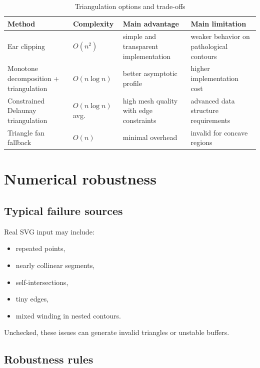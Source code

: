 \begin{table}[htbp]
\centering
\caption{Triangulation options and trade-offs}
\label{tab:triangulation_tradeoffs}
\begin{tabular}{>{\raggedright\arraybackslash}p{3.4cm} >{\raggedright\arraybackslash}p{2.2cm} >{\raggedright\arraybackslash}p{3.8cm} >{\raggedright\arraybackslash}p{4.5cm}}
\toprule
\textbf{Method} & \textbf{Complexity} & \textbf{Main advantage} & \textbf{Main limitation} \\
\midrule
Ear clipping & $O(n^2)$ & simple and transparent implementation & weaker behavior on pathological contours \\
Monotone decomposition + triangulation & $O(n \log n)$ & better asymptotic profile & higher implementation cost \\
Constrained Delaunay triangulation & $O(n \log n)$ avg. & high mesh quality with edge constraints & advanced data structure requirements \\
Triangle fan fallback & $O(n)$ & minimal overhead & invalid for concave regions \\
\bottomrule
\end{tabular}
\end{table}

\section{Numerical robustness}

\subsection{Typical failure sources}

Real SVG input may include:

\begin{itemize}
\item repeated points,
\item nearly collinear segments,
\item self-intersections,
\item tiny edges,
\item mixed winding in nested contours.
\end{itemize}

Unchecked, these issues can generate invalid triangles or unstable buffers.

\subsection{Robustness rules}

